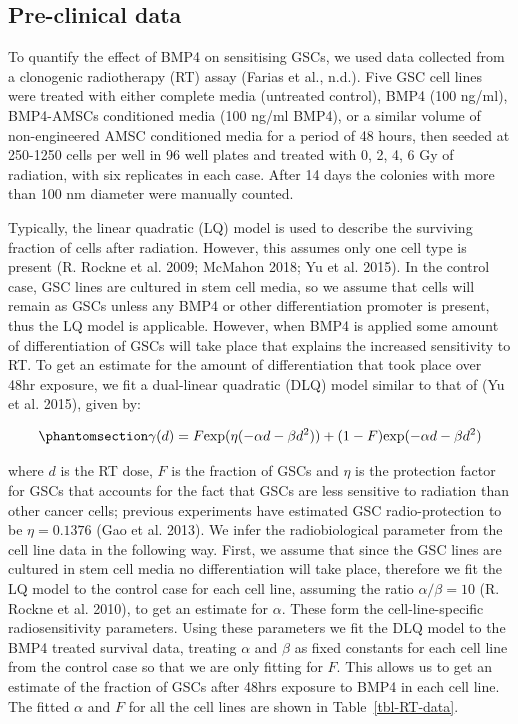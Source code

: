 \documentclass[
  default,
]{sn-jnl}
\begin{document}
\subsection{Pre-clinical data}\label{sec-pre-clinical-data}

To quantify the effect of BMP4 on sensitising GSCs, we used data
collected from a clonogenic radiotherapy (RT) assay (Farias et al.,
n.d.). Five GSC cell lines were treated with either complete media
(untreated control), BMP4 (100 ng/ml), BMP4-AMSCs conditioned media (100
ng/ml BMP4), or a similar volume of non-engineered AMSC conditioned
media for a period of 48 hours, then seeded at 250-1250 cells per well
in 96 well plates and treated with 0, 2, 4, 6 Gy of radiation, with six
replicates in each case. After 14 days the colonies with more than 100
nm diameter were manually counted.

Typically, the linear quadratic (LQ) model is used to describe the
surviving fraction of cells after radiation. However, this assumes only
one cell type is present (R. Rockne et al. 2009; McMahon 2018; Yu et al.
2015). In the control case, GSC lines are cultured in stem cell media,
so we assume that cells will remain as GSCs unless any BMP4 or other
differentiation promoter is present, thus the LQ model is applicable.
However, when BMP4 is applied some amount of differentiation of GSCs
will take place that explains the increased sensitivity to RT. To get an
estimate for the amount of differentiation that took place over 48hr
exposure, we fit a dual-linear quadratic (DLQ) model similar to that of
(Yu et al. 2015), given by:

\begin{equation}\phantomsection\label{eq-DLQ}{
  \gamma(d) = F \text{exp}(\eta(-\alpha d - \beta d^2)) + (1-F)\text{exp}(-\alpha d - \beta d^2)
}\end{equation}

where \(d\) is the RT dose, \(F\) is the fraction of GSCs and \(\eta\)
is the protection factor for GSCs that accounts for the fact that GSCs
are less sensitive to radiation than other cancer cells; previous
experiments have estimated GSC radio-protection to be \(\eta = 0.1376\)
(Gao et al. 2013). We infer the radiobiological parameter from the cell
line data in the following way. First, we assume that since the GSC
lines are cultured in stem cell media no differentiation will take
place, therefore we fit the LQ model to the control case for each cell
line, assuming the ratio \(\alpha / \beta = 10\) (R. Rockne et al.
2010), to get an estimate for \(\alpha\). These form the
cell-line-specific radiosensitivity parameters. Using these parameters
we fit the DLQ model to the BMP4 treated survival data, treating
\(\alpha\) and \(\beta\) as fixed constants for each cell line from the
control case so that we are only fitting for \(F\). This allows us to
get an estimate of the fraction of GSCs after 48hrs exposure to BMP4 in
each cell line. The fitted \(\alpha\) and \(F\) for all the cell lines
are shown in Table~\ref{tbl-RT-data}.
\end{document}

